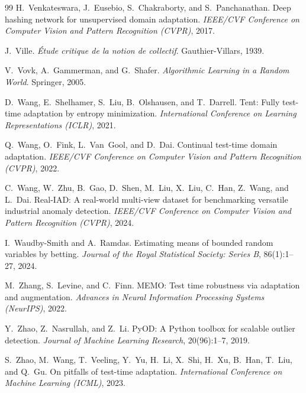 \begin{thebibliography}{99}
H.~Venkateswara, J.~Eusebio, S.~Chakraborty, and S.~Panchanathan.
Deep hashing network for unsupervised domain adaptation.
\textit{IEEE/CVF Conference on Computer Vision and Pattern Recognition (CVPR)}, 2017.

J.~Ville.
\textit{\'Etude critique de la notion de collectif}.
Gauthier-Villars, 1939.

V.~Vovk, A.~Gammerman, and G.~Shafer.
\textit{Algorithmic Learning in a Random World}.
Springer, 2005.

D.~Wang, E.~Shelhamer, S.~Liu, B.~Olshausen, and T.~Darrell.
Tent: Fully test-time adaptation by entropy minimization.
\textit{International Conference on Learning Representations (ICLR)}, 2021.

Q.~Wang, O.~Fink, L.~Van~Gool, and D.~Dai.
Continual test-time domain adaptation.
\textit{IEEE/CVF Conference on Computer Vision and Pattern Recognition (CVPR)}, 2022.

C.~Wang, W.~Zhu, B.~Gao, D.~Shen, M.~Liu, X.~Liu, C.~Han, Z.~Wang,
and L.~Dai.
Real-IAD: A real-world multi-view dataset for benchmarking versatile
industrial anomaly detection.
\textit{IEEE/CVF Conference on Computer Vision and Pattern Recognition (CVPR)}, 2024.

I.~Waudby-Smith and A.~Ramdas.
Estimating means of bounded random variables by betting.
\textit{Journal of the Royal Statistical Society: Series B}, 86(1):1--27, 2024.

M.~Zhang, S.~Levine, and C.~Finn.
MEMO: Test time robustness via adaptation and augmentation.
\textit{Advances in Neural Information Processing Systems (NeurIPS)}, 2022.

Y.~Zhao, Z.~Nasrullah, and Z.~Li.
PyOD: A Python toolbox for scalable outlier detection.
\textit{Journal of Machine Learning Research}, 20(96):1--7, 2019.

S.~Zhao, M.~Wang, T.~Veeling, Y.~Yu, H.~Li, X.~Shi, H.~Xu, B.~Han,
T.~Liu, and Q.~Gu.
On pitfalls of test-time adaptation.
\textit{International Conference on Machine Learning (ICML)}, 2023.

\end{thebibliography}
